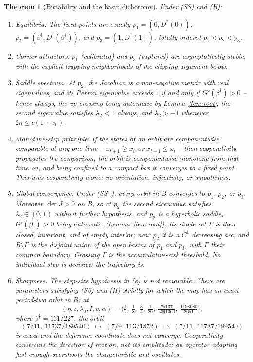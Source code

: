 \documentclass[11pt]{article}
\newtheorem{theorem}{Theorem}[section]
\theoremstyle{definition}
\theoremstyle{remark}
\numberwithin{equation}{section}
\begin{document}
\begin{theorem}[Bistability and the basin dichotomy]\label{thm:bistable}
Under (SS) and (H):
\begin{enumerate}
\item[(a)] \emph{Equilibria.} The fixed points are exactly $p_1 = (0, D^\ast(0))$, $p_2 = (\beta^\dagger, D^\ast(\beta^\dagger))$, and $p_3 = (1, D^\ast(1))$, totally ordered $p_1 < p_2 < p_3$.
\item[(b)] \emph{Corner attractors.} $p_1$ (calibrated) and $p_3$ (captured) are asymptotically stable, with the explicit trapping neighborhoods of the clipping argument below.
\item[(c)] \emph{Saddle spectrum.} At $p_2$, the Jacobian is a non-negative matrix with real eigenvalues, and its Perron eigenvalue exceeds $1$ \emph{if and only if} $G'(\beta^\dagger) > 0$ -- hence always, the up-crossing being automatic by Lemma~\ref{lem:root}; the second eigenvalue satisfies $\lambda_2 < 1$ always, and $\lambda_2 > -1$ whenever $2\eta \le c(1+s_0)$.
\item[(d)] \emph{Monotone-step principle.} If the states of an orbit are componentwise comparable at any one time -- $x_{t+1} \ge x_t$ or $x_{t+1} \le x_t$ -- then cooperativity propagates the comparison, the orbit is componentwise monotone from that time on, and being confined to a compact box it converges to a fixed point. This uses cooperativity alone: no orientation, injectivity, or smoothness.
\item[(e)] \emph{Global convergence.} Under (SS$^+$), every orbit in $B$ converges to $p_1$, $p_2$, or $p_3$. Moreover $\det J > 0$ on $B$, so at $p_2$ the second eigenvalue satisfies $\lambda_2 \in (0,1)$ without further hypothesis, and $p_2$ is a hyperbolic saddle, $G'(\beta^\dagger) > 0$ being automatic (Lemma~\ref{lem:root}). Its stable set $\Gamma$ is then closed, invariant, and of empty interior; near $p_2$ it is a $C^1$ decreasing arc; and $B \setminus \Gamma$ is the disjoint union of the open basins of $p_1$ and $p_3$, with $\Gamma$ their common boundary. Crossing $\Gamma$ is the accumulative-risk threshold. No individual step is decisive; the trajectory is.
\item[(f)] \emph{Sharpness.} The step-size hypothesis in (e) is not removable. There are parameters satisfying (SS) and (H) strictly for which the map has an exact period-two orbit in $B$: at
\[
(\eta, c, \lambda_0, I, v, \alpha) = \bigl(\tfrac12,\ \tfrac18,\ \tfrac34,\ \tfrac1{20},\ \tfrac{75137}{5391360},\ \tfrac{1198080}{2651}\bigr),
\]
where $\beta^\dagger = 161/227$, the orbit
\[
(7/11,\, 11737/189540) \;\mapsto\; (7/9,\, 113/1872) \;\mapsto\; (7/11,\, 11737/189540)
\]
is exact and the deference coordinate does not converge. Cooperativity constrains the direction of motion, not its amplitude; an operator adapting fast enough overshoots the characteristic and oscillates.
\end{enumerate}
\end{theorem}
\end{document}
